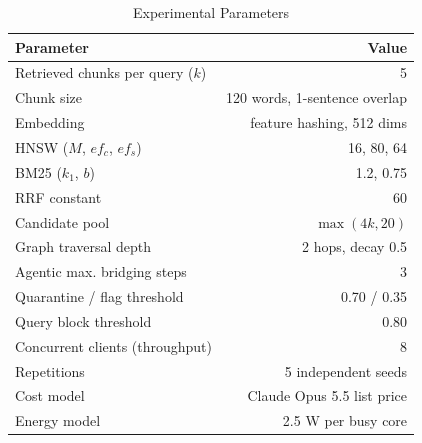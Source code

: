 \begin{table}[!htbp]
\centering
\caption{Experimental Parameters}
\label{tab:parameters}
\footnotesize
\begin{tabular*}{\columnwidth}{@{\extracolsep{\fill}}lr@{}}
\toprule
Parameter & Value \\
\midrule
Retrieved chunks per query ($k$) & 5 \\
Chunk size & 120 words, 1-sentence overlap \\
Embedding & feature hashing, 512 dims \\
HNSW ($M$, $ef_{c}$, $ef_{s}$) & 16, 80, 64 \\
BM25 ($k_1$, $b$) & 1.2, 0.75 \\
RRF constant & 60 \\
Candidate pool & $\max(4k, 20)$ \\
Graph traversal depth & 2 hops, decay 0.5 \\
Agentic max. bridging steps & 3 \\
Quarantine / flag threshold & 0.70 / 0.35 \\
Query block threshold & 0.80 \\
Concurrent clients (throughput) & 8 \\
Repetitions & 5 independent seeds \\
Cost model & Claude Opus 5.5 list price \\
Energy model & 2.5 W per busy core \\
\bottomrule
\end{tabular*}
\end{table}
